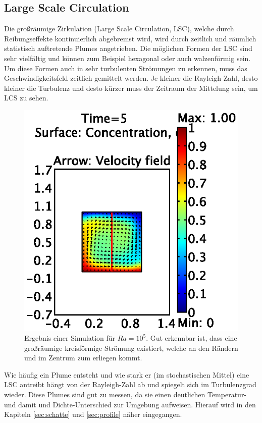 \documentclass[12pt,a4paper,titlepage,headinclude]{scrartcl}
\numberwithin{equation}{subsection}
\begin{document}
\subsection{Large Scale Circulation}
Die großräumige Zirkulation (Large Scale Circulation, LSC), welche durch Reibungseffekte kontinuierlich abgebremst wird, wird durch zeitlich und räumlich statistisch auftretende Plumes angetrieben.
Die möglichen Formen der LSC sind sehr vielfältig und können zum Beispiel hexagonal oder auch walzenförmig sein.
Um diese Formen auch in sehr turbulenten Strömungen zu erkennen, muss das Geschwindigkeitsfeld zeitlich gemittelt werden. 
Je kleiner die Rayleigh-Zahl, desto kleiner die Turbulenz und desto kürzer muss der Zeitraum der Mittelung sein, um LCS zu sehen.
\begin{figure}[!ht]
\centering
\includegraphics{1e5.eps}
\caption{Ergebnis einer Simulation für $Ra=10^5$. Gut erkennbar ist, dass eine großräumige kreisförmige Strömung existiert, welche an den Rändern und im Zentrum zum erliegen kommt.}
\label{fig:1e5_num}
\end{figure}

Wie häufig ein Plume entsteht und wie stark er (im stochastischen Mittel) eine LSC antreibt hängt von der Rayleigh-Zahl ab und spiegelt sich im Turbulenzgrad wieder.
Diese Plumes sind gut zu messen, da sie einen deutlichen Temperatur- und damit und Dichte-Unterschied zur Umgebung aufweisen.
Hierauf wird in den Kapiteln \ref{sec:schatte} und \ref{sec:profile} näher eingegangen.
\end{document}
